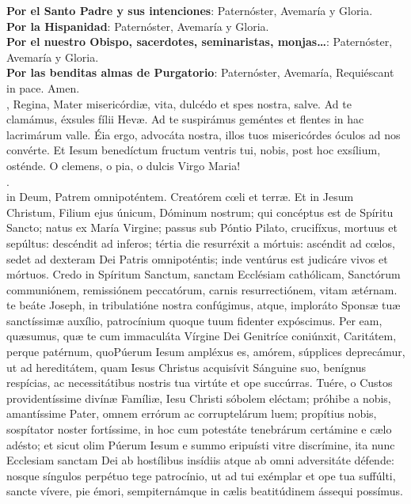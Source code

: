 \documentclass[9pt]{article}
\begin{document}
\begin{multicols*}{2}
    \textbf{Por el Santo Padre y sus intenciones}: Paternóster, Avemaría y Gloria.\\
    \textbf{Por la Hispanidad}: Paternóster, Avemaría y Gloria.\\
    \textbf{Por el nuestro Obispo, sacerdotes, seminaristas, monjas\ldots}: Paternóster, Avemaría y Gloria.\\
    \textbf{Por las benditas almas de Purgatorio}: Paternóster, Avemaría, Requiéscant in pace. Amen. \\

    , Regina, Mater misericórdi{\ae}, vita, dulcédo et spes nostra, salve. Ad te clamámus, éxsules fílii Hev{\ae}.
    Ad te suspirámus geméntes et flentes in hac lacrimárum valle. Éia ergo, advocáta nostra, illos tuos misericórdes óculos ad nos convérte.
    Et Iesum benedíctum fructum ventris tui, nobis, post hoc exsílium, osténde. O clemens, o pia, o dulcis Virgo Maria!\\
    \orapronobissalveinline.\\

     in Deum, Patrem omnipoténtem. Creatórem c{\oe}li et terr{\ae}. Et in Jesum Christum, Filium ejus únicum, Dóminum nostrum;
    qui concéptus est de Spíritu Sancto; natus ex María Virgine; passus sub Póntio Pilato, crucifíxus, mortuus et sepúltus:
    descéndit ad inferos; tértia die resurréxit a mórtuis: ascéndit ad c{\oe}los, sedet ad dexteram Dei Patris omnipoténtis;
    inde ventúrus est judicáre vivos et mórtuos. Credo in Spíritum Sanctum, sanctam Ecclésiam cathólicam, Sanctórum communiónem,
    remissiónem peccatórum, carnis resurrectiónem, vitam {\ae}térnam.\\

     te beáte Joseph, in tribulatióne nostra confúgimus, atque, imploráto Spons{\ae} tu{\ae} sanctíssim{\ae} auxílio, patrocínium 
    quoque tuum fidenter expóscimus. Per eam, qu{\ae}sumus, qu{\ae} te cum immaculáta Vírgine Dei Genitríce coniúnxit, Caritátem, perque patérnum, 
    quoPúerum Iesum ampléxus es, amórem, súpplices deprecámur, ut ad hereditátem, quam Iesus Christus acquisívit Sánguine suo, benígnus respícias, 
    ac necessitátibus nostris tua virtúte et ope succúrras. Tuére, o Custos providentíssime divín{\ae} Famíli{\ae}, Iesu Christi sóbolem eléctam; próhibe a nobis, 
    amantíssime Pater, omnem errórum ac corruptelárum luem; propítius nobis, sospítator noster fortíssime, in hoc cum potestáte tenebrárum certámine e 
    c{\ae}lo adésto; et sicut olim Púerum Iesum e summo eripuísti vitre discrímine, ita nunc Ecclesiam sanctam Dei ab hostílibus insídiis atque ab omni 
    adversitáte défende: nosque síngulos perpétuo tege patrocínio, ut ad tui exémplar et ope tua suffúlti, sancte vívere, pie émori, sempiternámque in 
    c{\ae}lis beatitúdinem ássequi possímus. \\


\end{multicols*}
\end{document}
